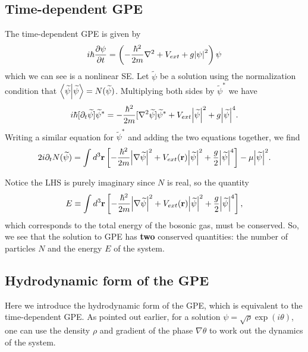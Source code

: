 \documentclass{book}
\theoremstyle{definition}
\newcommand{\p}{\partial}
\newcommand{\f}[2]{\frac{#1}{#2}}
\newcommand{\lp}{\left(}
\newcommand{\rp}{\right)}
\newcommand{\lb}{\left[}
\newcommand{\rb}{\right]}
\begin{document}
\subsection*{Time-dependent GPE}

The time-dependent GPE is given by 
\begin{equation*}
i\hbar \f{\p\psi}{\p t} = \lp -\f{\hbar^2}{2m} \nabla^2 + V_{ext} + g\abs{\psi}^2 \rp \psi
\end{equation*}
which we can see is a nonlinear SE. Let $\widetilde{\psi}$ be a solution using the normalization condition that $\braket{\widetilde{\psi}} = N(\widetilde{\psi})$. Multiplying both sides by $\widetilde{\psi}^*$ we have
\begin{equation*}
i\hbar [\p_t \widetilde{\psi}] \widetilde{\psi}^* = -\f{\hbar^2}{2m} [\nabla^2 \widetilde{\psi} ] \widetilde{\psi}^* + V_{ext} \abs{\widetilde{\psi}}^2 + g \abs{\widetilde{\psi}}^4.
\end{equation*}
Writing a similar equation for $\widetilde{\psi}^*$ and adding the two equations together, we find 
\begin{equation*}
2i\p_t N(\widetilde{\psi}) = \int d^3 \mathbf{r} \lb -\f{\hbar^2}{2m} \abs{\nabla \widetilde{\psi}}^2 + V_{ext}(\mathbf{r}) \abs{\widetilde{\psi}}^2 + \f{g}{2} \abs{\widetilde{\psi}}^4 \rb - \mu \abs{\widetilde{\psi}}^2.
\end{equation*}

Notice the LHS is purely imaginary since $N$ is real, so the quantity
\begin{equation*}
E \equiv \int d^3 \mathbf{r} \lb -\f{\hbar^2}{2m} \abs{\nabla \widetilde{\psi}}^2 + V_{ext}(\mathbf{r}) \abs{\widetilde{\psi}}^2 + \f{g}{2} \abs{\widetilde{\psi}}^4 \rb,
\end{equation*}
which corresponds to the total energy of the bosonic gas, must be conserved. So, we see that the solution to GPE has \textbf{two} conserved quantities: the number of particles $N$ and the energy $E$ of the system. 


\subsection*{Hydrodynamic form of the GPE}

Here we introduce the hydrodynamic form of the GPE, which is equivalent to the time-dependent GPE. As pointed out earlier, for a solution $\psi = \sqrt{\rho} \exp(i\theta)$, one can use the density $\rho$ and gradient of the phase $\nabla \theta$ to work out the dynamics of the system.\\
\end{document}
